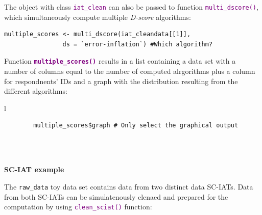 \documentclass[a0,landscape]{a0poster}
\begin{document}
\begin{multicols*}{3}
\vspace{3mm}

The object with class \textcolor{purple}{\texttt{iat\_clean}} can also be passed to function \textcolor{purple}{\texttt{multi\_dscore()}}, which simultaneously compute multiple \emph{D-score} algorithms: 
\begin{lstlisting}
multiple_scores <- multi_dscore(iat_cleandata[[1]], 
	            ds = `error-inflation`) #Which algorithm?
\end{lstlisting}

Function \textbf{\textcolor{purple}{\texttt{multiple\_scores()}}} results in a list containing a data set with a number of columns equal to the number of computed alrgorithms plus a column for respondnents' IDs and a graph with the distribution resulting from the different algorithms: 


	\begin{tabular}{l}
		\begin{lstlisting}
		multiple_scores$graph # Only select the graphical output
		\end{lstlisting}\\
		
		  \\
	\end{tabular}


 
\vfill\null
\columnbreak

\begin{center}
	\huge \textbf{\textcolor{title}{SC-IAT example}}
\end{center}

The \texttt{raw\_data} toy data set contains data from two distinct data SC-IATs. Data from both SC-IATs can be simulatenously clenaed and prepared for the computation by using \textcolor{purple}{\texttt{clean\_sciat()}} function: 


\end{multicols*}
\end{document}
